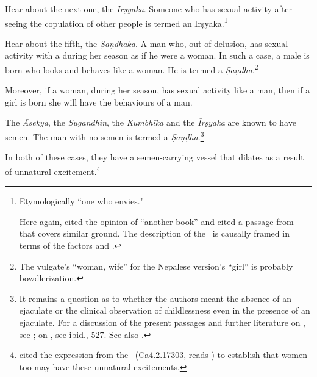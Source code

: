 \begin{translation}
Hear about the next one, the \emph{Īrṣyaka}.  
Someone who has sexual activity after seeing the copulation of other people 
is termed an Īrṣyaka.\footnote{Etymologically “one who envies."  
    
    Here again,  cited the opinion of “another 
    book” and cited a passage from \CS\  that covers similar 
    ground.  The description of the \CS\ is causally framed in terms of the 
    factors  and .} 

\item [41d--42]

Hear about the fifth, the \emph{Ṣaṇdhaka}.  A man who, out of
delusion, has sexual activity with a  during
her season as if he were a woman.  In such a case, a male is born who
looks and behaves like a woman.  He is termed a
\emph{Ṣaṇḍha}.\footnote{The vulgate's  “woman, wife” for
the Nepalese version's    “girl” is probably bowdlerization.}
    
\item[43]
    
Moreover, if a woman, during her season, has sexual activity like a man, then 
if a girl is born she will have the behaviours of a man.

\item[44]

The \emph{Āsekya}, the \emph{Sugandhin}, the \emph{Kumbhīka} and the
\emph{Īrṣyaka} are known to have semen.  The man with no semen is
termed a \emph{Ṣaṇḍha}.\footnote{It
    remains a question as to whether the authors meant the absence of an
    ejaculate or the clinical observation of childlessness even in the
    presence of an ejaculate. For a discussion of the present passages and
    further literature on , see \cite[581--584]{das-2003}; on
    , see ibid., 527.  See also \cites[593--597, et
    passim]{swee-1993}{zwil-2000}{zwil-2010}.}
    
\item [45]

In both of these cases, they have a semen-carrying vessel that
dilates as a result of unnatural
excitement.\footnote{ %
    cited the expression  from the \CS\
    (Ca{4.2.17}{303}, reads ) to establish that women too may
    have these unnatural excitements.
    
}
\end{translation}
